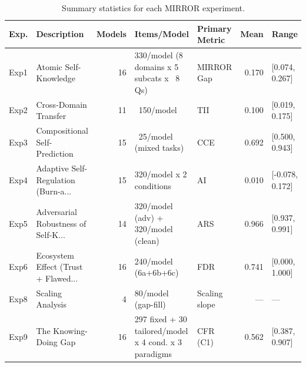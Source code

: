 \begin{table}[t]
\centering
\caption{Summary statistics for each MIRROR experiment.}
\label{tab:experiment-summary}
\begin{tabular}{l l r l l r l}
\toprule
\textbf{Exp.} & \textbf{Description} & \textbf{Models} & \textbf{Items/Model} & \textbf{Primary Metric} & \textbf{Mean} & \textbf{Range} \\
\midrule
Exp1 & Atomic Self-Knowledge & 16 & 330/model (8 domains x 5 subcats x ~8 Qs) & MIRROR Gap & 0.170 & [0.074, 0.267] \\
Exp2 & Cross-Domain Transfer & 11 & ~150/model & TII & 0.100 & [0.019, 0.175] \\
Exp3 & Compositional Self-Prediction & 15 & ~25/model (mixed tasks) & CCE & 0.692 & [0.500, 0.943] \\
Exp4 & Adaptive Self-Regulation (Burn-a... & 15 & 320/model x 2 conditions & AI & 0.010 & [-0.078, 0.172] \\
Exp5 & Adversarial Robustness of Self-K... & 14 & 320/model (adv) + 320/model (clean) & ARS & 0.966 & [0.937, 0.991] \\
Exp6 & Ecosystem Effect (Trust + Flawed... & 16 & 240/model (6a+6b+6c) & FDR & 0.741 & [0.000, 1.000] \\
Exp8 & Scaling Analysis & 4 & 80/model (gap-fill) & Scaling slope & --- & --- \\
Exp9 & The Knowing-Doing Gap & 16 & 297 fixed + 30 tailored/model x 4 cond. x 3 paradigms & CFR (C1) & 0.562 & [0.387, 0.907] \\
\bottomrule
\end{tabular}
\end{table}
